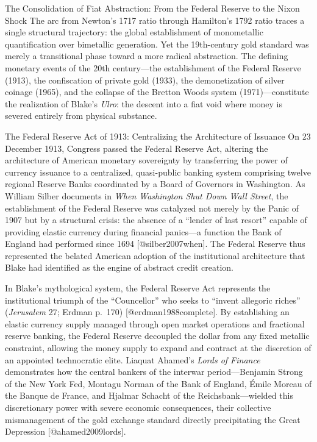 \documentclass[
  ignorenonframetext,
]{beamer}
\author{\texorpdfstring{}{}}
\date{}
\begin{document}
\begin{frame}{The Consolidation of Fiat Abstraction: From the Federal
Reserve to the Nixon Shock}
\protect{}\label{the-consolidation-of-fiat-abstraction-from-the-federal-reserve-to-the-nixon-shock}
The arc from Newton's 1717 ratio through Hamilton's 1792 ratio traces a
single structural trajectory: the global establishment of monometallic
quantification over bimetallic generation. Yet the 19th-century gold
standard was merely a transitional phase toward a more radical
abstraction. The defining monetary events of the 20th century---the
establishment of the Federal Reserve (1913), the confiscation of private
gold (1933), the demonetization of silver coinage (1965), and the
collapse of the Bretton Woods system (1971)---constitute the realization
of Blake's \emph{Ulro}: the descent into a fiat void where money is
severed entirely from physical substance.

\begin{block}{The Federal Reserve Act of 1913: Centralizing the
Architecture of Issuance}
\protect{}\label{the-federal-reserve-act-of-1913-centralizing-the-architecture-of-issuance}
On 23 December 1913, Congress passed the Federal Reserve Act, altering
the architecture of American monetary sovereignty by transferring the
power of currency issuance to a centralized, quasi-public banking system
comprising twelve regional Reserve Banks coordinated by a Board of
Governors in Washington. As William Silber documents in \emph{When
Washington Shut Down Wall Street}, the establishment of the Federal
Reserve was catalyzed not merely by the Panic of 1907 but by a
structural crisis: the absence of a ``lender of last resort'' capable of
providing elastic currency during financial panics---a function the Bank
of England had performed since 1694 {[}@silber2007when{]}. The Federal
Reserve thus represented the belated American adoption of the
institutional architecture that Blake had identified as the engine of
abstract credit creation.

In Blake's mythological system, the Federal Reserve Act represents the
institutional triumph of the ``Councellor'' who seeks to ``invent
allegoric riches'' (\emph{Jerusalem} 27; Erdman p.~170)
{[}@erdman1988complete{]}. By establishing an elastic currency supply
managed through open market operations and fractional reserve banking,
the Federal Reserve decoupled the dollar from any fixed metallic
constraint, allowing the money supply to expand and contract at the
discretion of an appointed technocratic elite. Liaquat Ahamed's
\emph{Lords of Finance} demonstrates how the central bankers of the
interwar period---Benjamin Strong of the New York Fed, Montagu Norman of
the Bank of England, Émile Moreau of the Banque de France, and Hjalmar
Schacht of the Reichsbank---wielded this discretionary power with severe
economic consequences, their collective mismanagement of the gold
exchange standard directly precipitating the Great Depression
{[}@ahamed2009lords{]}.
\end{block}


\end{frame}
\end{document}
